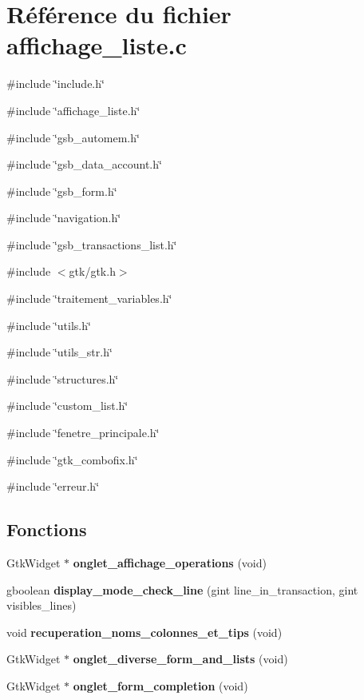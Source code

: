 \section{Référence du fichier affichage\_\-liste.c}
\label{affichage__liste_8c}
{\ttfamily \#include \char`\"{}include.h\char`\"{}}\par
{\ttfamily \#include \char`\"{}affichage\_\-liste.h\char`\"{}}\par
{\ttfamily \#include \char`\"{}gsb\_\-automem.h\char`\"{}}\par
{\ttfamily \#include \char`\"{}gsb\_\-data\_\-account.h\char`\"{}}\par
{\ttfamily \#include \char`\"{}gsb\_\-form.h\char`\"{}}\par
{\ttfamily \#include \char`\"{}navigation.h\char`\"{}}\par
{\ttfamily \#include \char`\"{}gsb\_\-transactions\_\-list.h\char`\"{}}\par
{\ttfamily \#include $<$gtk/gtk.h$>$}\par
{\ttfamily \#include \char`\"{}traitement\_\-variables.h\char`\"{}}\par
{\ttfamily \#include \char`\"{}utils.h\char`\"{}}\par
{\ttfamily \#include \char`\"{}utils\_\-str.h\char`\"{}}\par
{\ttfamily \#include \char`\"{}structures.h\char`\"{}}\par
{\ttfamily \#include \char`\"{}custom\_\-list.h\char`\"{}}\par
{\ttfamily \#include \char`\"{}fenetre\_\-principale.h\char`\"{}}\par
{\ttfamily \#include \char`\"{}gtk\_\-combofix.h\char`\"{}}\par
{\ttfamily \#include \char`\"{}erreur.h\char`\"{}}\par
\subsection*{Fonctions}
\begin{DoxyCompactItemize}
\item 
GtkWidget $\ast$ {\bf onglet\_\-affichage\_\-operations} (void)
\item 
gboolean {\bf display\_\-mode\_\-check\_\-line} (gint line\_\-in\_\-transaction, gint visibles\_\-lines)
\item 
void {\bf recuperation\_\-noms\_\-colonnes\_\-et\_\-tips} (void)
\item 
GtkWidget $\ast$ {\bf onglet\_\-diverse\_\-form\_\-and\_\-lists} (void)
\item 
GtkWidget $\ast$ {\bf onglet\_\-form\_\-completion} (void)
\end{DoxyCompactItemize}
